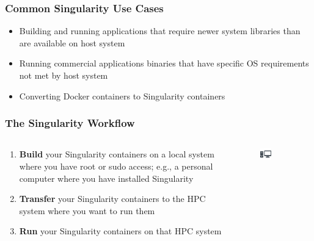 \documentclass{beamer}
\begin{document}
\begin{frame}
   \frametitle{Common Singularity Use Cases}
   \begin{itemize}
      \setlength\itemsep{1.0em}
      \item Building and running applications that require newer system
         libraries than are available on host system
      \item Running commercial applications binaries that have specific
         OS requirements not met by host system
      \item Converting Docker containers to Singularity containers
   \end{itemize}
\end{frame}

\begin{frame}
   \frametitle{The Singularity Workflow}
   \vspace{-2.0em}
   \begin{columns}
      \begin{column}{0.6\textwidth}
         \begin{enumerate}
            \setlength\itemsep{1.0em}
            \item \textbf{Build} your Singularity containers on a local system 
               where you have root or sudo access; e.g., a personal 
               computer where you have installed Singularity 
            \item \textbf{Transfer} your Singularity containers to the HPC system 
               where you want to run them
            \item \textbf{Run} your Singularity containers on that HPC system
         \end{enumerate}
      \end{column}
      \hfill
      \begin{column}{0.5\textwidth}
         \begin{figure}[htbp]
            \includegraphics[width=0.4\textwidth]{images/desktop-icon.png}
         \end{figure}

\end{column}
\end{columns}
\end{frame}
\end{document}
